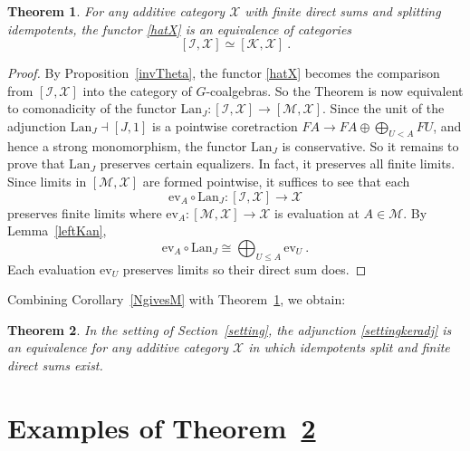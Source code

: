 \documentclass[a4paper,12pt,reqno]{amsart}
\newtheorem{theorem}{Theorem}[section] %
\theoremstyle{definition}
\theoremstyle{fact}
\theoremstyle{genquest}
\theoremstyle{step}
\newcommand{\dd}{\colon}
\newcommand{\lra}{\longrightarrow}
\newcommand{\ra}{\rightarrow}
\def\CI{{\mathscr I}}
\def\CK{{\mathscr K}}
\def\CM{{\mathscr M}}
\def\CX{{\mathscr X}}
\begin{document}
\begin{theorem}\label{specialthm}
For any additive category $\CX$
with finite direct sums and splitting idempotents, 
the functor \eqref{hatX} is an equivalence of categories
$$[\CI, \CX] \simeq [\CK, \CX] \ . $$
\end{theorem}
\begin{proof}
By Proposition~\ref{invTheta}, the functor \eqref{hatX} becomes the
comparison from $[\CI,\CX]$ into the category of $G$-coalgebras. 
So the Theorem is now equivalent to comonadicity of the functor 
$\mathrm{Lan}_J \dd [\CI,\CX]\ra [\CM,\CX]$.
Since the unit of the adjunction $\mathrm{Lan}_J \dashv [J,1]$ is a
pointwise coretraction $FA \lra FA\oplus \bigoplus_{U< A}{FU}$, 
and hence a strong monomorphism, 
the functor $\mathrm{Lan}_J$ is conservative. 
So it remains to prove that $\mathrm{Lan}_J$ preserves certain equalizers.
In fact, it preserves all finite limits. Since limits in $[\CM,\CX]$ are formed
pointwise, it suffices to see that each 
$$\mathrm{ev}_A\circ \mathrm{Lan}_J \dd [\CI,\CX]\lra \CX$$
preserves finite limits where $\mathrm{ev}_A \dd [\CM,\CX]\ra \CX$ is evaluation
at $A\in \CM$. By Lemma~\ref{leftKan}, 
$$\mathrm{ev}_A\circ \mathrm{Lan}_J \cong \bigoplus_{U\le A}\mathrm{ev}_U \ .$$
Each evaluation $\mathrm{ev}_U$ preserves limits so their direct sum does.    
\end{proof}

Combining Corollary~\ref{NgivesM} with Theorem~\ref{specialthm}, we obtain: 

\begin{theorem}\label{settingmainthm}
In the setting of Section~\ref{setting}, the adjunction \eqref{settingkeradj} is an equivalence for any additive category $\CX$ in which idempotents split and finite direct sums exist. 
\end{theorem}

\section{Examples of Theorem~\ref{settingmainthm}}\label{exx}
\end{document}
